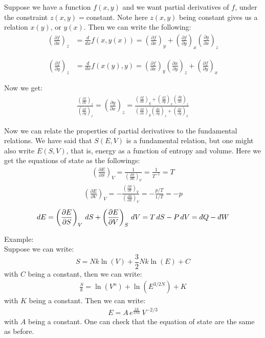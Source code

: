 \documentclass[11pt]{article}
\theoremstyle{break}
\theoremstyle{break}
\newcommand{\pd}{\partial}
\newcommand{\dbar}{d\hspace*{-0.08em}\bar{}\hspace*{0.1em}}
\newcommand{\example}{\color{green}Example: \color{black}}
\begin{document}
Suppose we have a function $f(x,y)$ and we want partial derivatives of $f$, under the constraint $z(x,y) = $constant. Note here $z(x,y)$ being constant gives us a relation $x(y)$, or $y(x)$. Then we can write the following:
\begin{align*}
\left( \frac{\partial f}{\partial x}\right)_z &= \frac{d}{dx}f(x,y(x)) = \left( \frac{\partial f}{\partial x}\right)_y + \left( \frac{\partial f}{\partial y}\right)_x \left( \frac{\partial y}{\partial x}\right)_z 
\end{align*}

\begin{align*}
\left( \frac{\partial f}{\partial y}\right)_z &= \frac{d}{dx}f(x(y),y) = \left( \frac{\partial f}{\partial x}\right)_y \left( \frac{\partial x}{\partial y}\right)_z + \left( \frac{\partial f}{\partial y}\right)_x 
\end{align*}

Now we get:
\begin{align*}
\frac{\left( \frac{\partial f}{\partial x}\right)_z}{\left(\frac{\partial f}{\partial y}\right)_z} = \left( \frac{\partial y}{\partial x}\right)_z = \frac{ \left( \frac{\partial f}{\partial x}\right)_y + \left( \frac{\partial f}{\partial y}\right)_x \left( \frac{\partial y}{\partial x}\right)_z }{\left( \frac{\partial f}{\partial x}\right)_y \left( \frac{\partial x}{\partial y}\right)_z + \left( \frac{\partial f}{\partial y}\right)_x }
\end{align*}


Now we can relate the properties of partial derivatives to the fundamental relations. We have said that $S(E,V)$ is a fundamental relation, but one might also write $E(S,V)$, that is, energy as a function of entropy and volume. Here we get the equations of state as the followings:
\begin{align*}
\left(\frac{\partial E}{\partial S} \right)_V = \frac{1}{\left(\frac{\pd S}{\pd E} \right)_V} = \frac{1}{T^{-1}}  = T
\end{align*}
\begin{align*}
\left(\frac{\pd E}{\pd V} \right)_V = - \frac{\left( \frac{\pd S}{\pd V}\right)_V}{\left( \frac{\pd S}{\pd E}\right)_V} = -\frac{p/T}{1/T} = -p 
\end{align*}
\begin{align*}
dE = \left(\frac{\pd E}{\pd S} \right)_V \, dS + \left( \frac{\pd E}{\pd V}\right)_S \, dV = T\, dS - P\, dV = \dbar Q - \dbar W
\end{align*}


\example\\
Suppose we can write: $$S = Nk\ln (V) + \frac{3}{2}N k \ln(E) + C$$
with $C$ being a constant, then we can write:
\begin{align*}
\frac{S}{k} = \ln(V^n) + \ln(E^{3/2 N}) + K
\end{align*}
with $K$ being a constant. Then we can write:
\begin{align*}
E = A\, e^{\frac{2S}{3Nk}}\, V^{-2/3}
\end{align*}
with $A$ being a constant. One can check that the equation of state are the same as before.\\
\end{document}
